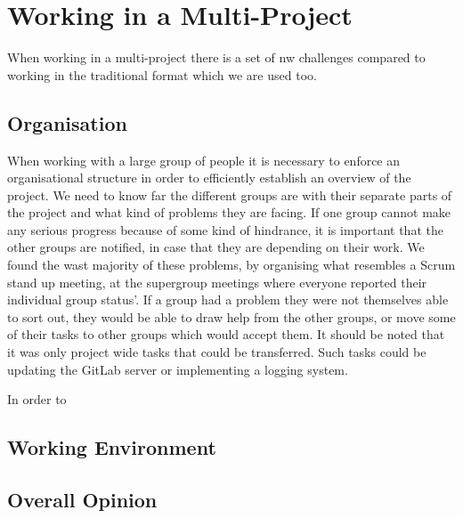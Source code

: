 \section{Working in a Multi-Project}
When working in a multi-project there is a set of nw challenges compared to working in the traditional format which we are used too.

\subsection{Organisation}
When working with a large group of people it is necessary to enforce an organisational structure in order to efficiently establish an overview of the project. We need to know far the different groups are with their separate parts of the project and what kind of problems they are facing. If one group cannot make any serious progress because of some kind of hindrance, it is important that the other groups are notified, in case that they are depending on their work. We found the wast majority of these problems, by organising what resembles a Scrum stand up meeting, at the supergroup meetings where everyone reported their individual group status'. If a group had a problem they were not themselves able to sort out, they would be able to draw help from the other groups, or move some of their tasks to other groups which would accept them. It should be noted that it was only project wide tasks that could be transferred. Such tasks could be updating the GitLab server or implementing a logging system.

In order to 

\subsection{Working Environment}


\subsection{Overall Opinion}
